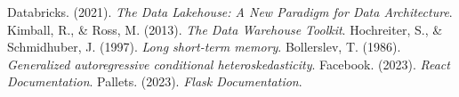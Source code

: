 \begin{thebibliography}{99}
 Databricks. (2021). \textit{The Data Lakehouse: A New Paradigm for Data Architecture}.
 Kimball, R., \& Ross, M. (2013). \textit{The Data Warehouse Toolkit}.
 Hochreiter, S., \& Schmidhuber, J. (1997). \textit{Long short-term memory}.
 Bollerslev, T. (1986). \textit{Generalized autoregressive conditional heteroskedasticity}.
 Facebook. (2023). \textit{React Documentation}.
 Pallets. (2023). \textit{Flask Documentation}.
\end{thebibliography}
